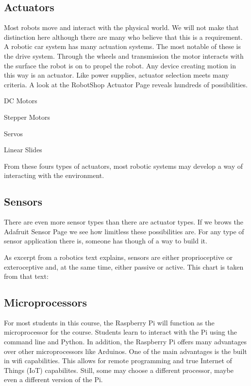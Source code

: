 \documentclass[
]{book}
\begin{document}
\hypertarget{actuators}{%
\subsection{Actuators}\label{actuators}}

Most robots move and interact with the physical world. We will not make that distinction here although there are many who believe that this is a requirement. A robotic car system has many actuation systems. The most notable of these is the drive system. Through the wheels and transmission the motor interacts with the surface the robot is on to propel the robot. Any device creating motion in this way is an actuator. Like power supplies, actuator selection meets many criteria. A look at the RobotShop Actuator Page reveals hundreds of possibilities.

DC Motors

Stepper Motors

Servos

Linear Slides

From these fours types of actuators, most robotic systems may develop a way of interacting with the environment.

\hypertarget{sensors}{%
\subsection{Sensors}\label{sensors}}

There are even more sensor types than there are actuator types. If we brows the Adafruit Sensor Page we see how limitless these possibilities are. For any type of sensor application there is, someone has though of a way to build it.

As excerpt from a robotics text explains, sensors are either proprioceptive or exteroceptive and, at the same time, either passive or active. This chart is taken from that text:

\hypertarget{microprocessors}{%
\subsection{Microprocessors}\label{microprocessors}}

For most students in this course, the Raspberry Pi will function as the microprocessor for the course. Students learn to interact with the Pi using the command line and Python. In addition, the Raspberry Pi offers many advantages over other microprocessors like Arduinos. One of the main advantages is the built in wifi capabilities. This allows for remote programming and true Internet of Things (IoT) capabilites. Still, some may choose a different processor, maybe even a different version of the Pi.
\end{document}
